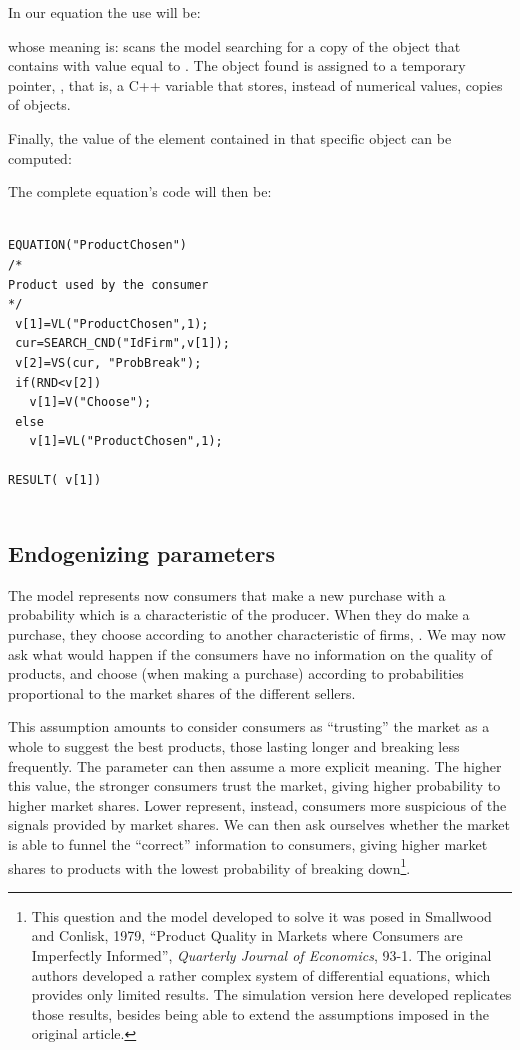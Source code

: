 \documentclass [11pt,a4paper] {book}
\begin{document}
In our equation the use will be:


whose meaning is: scans the model searching for a copy of the object that contains  with value equal to . The object found is assigned to a temporary pointer, , that is, a C++ variable that stores, instead of numerical values, copies of objects.

Finally, the value of the element  contained in that specific object can be computed:


The complete equation's code will then be:


\begin{minipage}[h]{10cm}
\small
\begin{verbatim}

EQUATION("ProductChosen")
/*
Product used by the consumer
*/
 v[1]=VL("ProductChosen",1);
 cur=SEARCH_CND("IdFirm",v[1]);
 v[2]=VS(cur, "ProbBreak");
 if(RND<v[2])
   v[1]=V("Choose");
 else
   v[1]=VL("ProductChosen",1);

RESULT( v[1])
 
\end{verbatim}
\normalsize
\end{minipage}

\subsection{Endogenizing parameters}

The model represents now consumers that make a new purchase with a probability which is a characteristic of the producer. When they do make a purchase, they choose according to another characteristic of firms, . We may now ask what would happen if the consumers have no information on the quality of products, and choose (when making a purchase) according to probabilities proportional to the market shares of the different sellers.

This assumption amounts to consider consumers as ``trusting'' the market as a whole to suggest the best products, those lasting longer and breaking less frequently. The parameter  can then assume a more explicit meaning. The higher this value, the stronger consumers trust the market, giving higher probability to higher market shares. Lower  represent, instead, consumers more suspicious of the signals provided by market shares. We can then ask ourselves whether the market is able to funnel the ``correct'' information to consumers, giving higher market shares to products with the lowest probability of breaking down\footnote{This question and the model developed to solve it was posed in Smallwood and Conlisk, 1979, ``Product Quality in Markets where Consumers are Imperfectly Informed'', \textit{Quarterly Journal of Economics}, 93-1. The original authors developed a rather complex system of differential equations, which provides only limited results. The simulation version here developed replicates those results, besides being able to extend the assumptions imposed in the original article.}.
\end{document}
